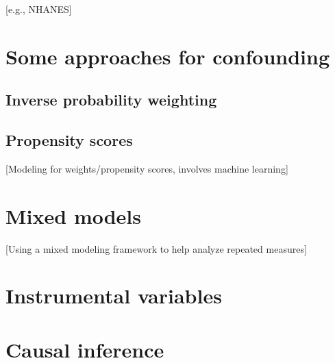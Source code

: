 \documentclass[
]{book}
\begin{document}
{[}e.g., NHANES{]}

\hypertarget{some-approaches-for-confounding}{%
\chapter{Some approaches for confounding}\label{some-approaches-for-confounding}}

\hypertarget{inverse-probability-weighting}{%
\section{Inverse probability weighting}\label{inverse-probability-weighting}}

\hypertarget{propensity-scores}{%
\section{Propensity scores}\label{propensity-scores}}

{[}Modeling for weights/propensity scores, involves machine learning{]}

\hypertarget{mixed-models}{%
\chapter{Mixed models}\label{mixed-models}}

{[}Using a mixed modeling framework to help analyze repeated measures{]}

\hypertarget{instrumental-variables}{%
\chapter{Instrumental variables}\label{instrumental-variables}}

\hypertarget{causal-inference}{%
\chapter{Causal inference}\label{causal-inference}}

  
\end{document}
